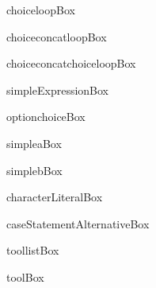 \begin{figure}
\centerline{\usebox{\choiceloopBox}}
\caption{choiceloopBox}
\label{fig:choiceloopBox}
\end{figure}

\begin{figure}
\centerline{\usebox{\choiceconcatloopBox}}
\caption{choiceconcatloopBox}
\label{fig:choiceconcatloopBox}
\end{figure}

\begin{figure}
\centerline{\usebox{\choiceconcatchoiceloopBox}}
\caption{choiceconcatchoiceloopBox}
\label{fig:choiceconcatchoiceloopBox}
\end{figure}

\begin{figure}
\centerline{\usebox{\simpleExpressionBox}}
\caption{simpleExpressionBox}
\label{fig:simpleExpressionBox}
\end{figure}

\begin{figure}
\centerline{\usebox{\optionchoiceBox}}
\caption{optionchoiceBox}
\label{fig:optionchoiceBox}
\end{figure}

\begin{figure}
\centerline{\usebox{\simpleaBox}}
\caption{simpleaBox}
\label{fig:simpleaBox}
\end{figure}

\begin{figure}
\centerline{\usebox{\simplebBox}}
\caption{simplebBox}
\label{fig:simplebBox}
\end{figure}

\begin{figure}
\centerline{\usebox{\characterLiteralBox}}
\caption{characterLiteralBox}
\label{fig:characterLiteralBox}
\end{figure}

\begin{figure}
\centerline{\usebox{\caseStatementAlternativeBox}}
\caption{caseStatementAlternativeBox}
\label{fig:caseStatementAlternativeBox}
\end{figure}

\begin{figure}
\centerline{\usebox{\toollistBox}}
\caption{toollistBox}
\label{fig:toollistBox}
\end{figure}

\begin{figure}
\centerline{\usebox{\toolBox}}
\caption{toolBox}
\label{fig:toolBox}
\end{figure}

